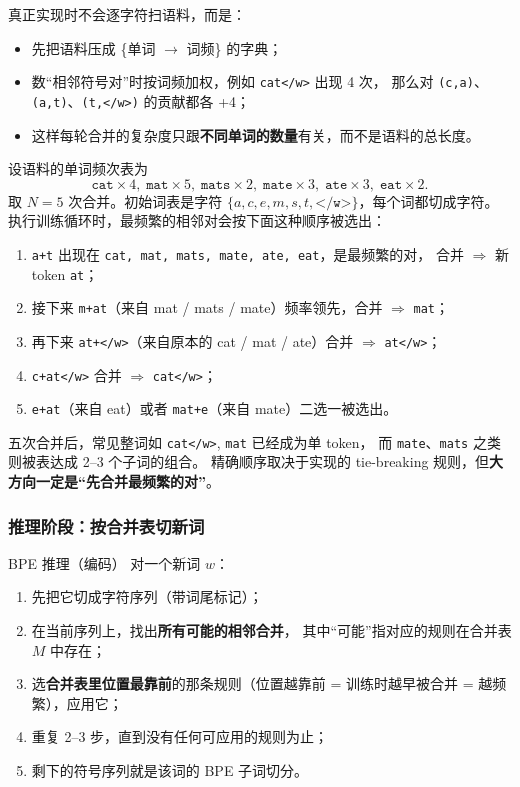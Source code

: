 \begin{engbox}[实现上的小技巧]
真正实现时不会逐字符扫语料，而是：
\begin{itemize}
    \item 先把语料压成 \{单词 $\to$ 词频\} 的字典；
    \item 数“相邻符号对”时按词频加权，例如 \texttt{cat</w>} 出现 4 次，
          那么对 \texttt{(c,a)}、\texttt{(a,t)}、\texttt{(t,</w>)} 的贡献都各 +4；
    \item 这样每轮合并的复杂度只跟\textbf{不同单词的数量}有关，而不是语料的总长度。
\end{itemize}
\end{engbox}

\begin{example}[一个迷你语料]
设语料的单词频次表为
\[
\texttt{cat}\!\times\!4,\;
\texttt{mat}\!\times\!5,\;
\texttt{mats}\!\times\!2,\;
\texttt{mate}\!\times\!3,\;
\texttt{ate}\!\times\!3,\;
\texttt{eat}\!\times\!2.
\]
取 $N=5$ 次合并。初始词表是字符 $\{a,c,e,m,s,t,\texttt{</w>}\}$，每个词都切成字符。
执行训练循环时，最频繁的相邻对会按下面这种顺序被选出：
\begin{enumerate}
    \item \texttt{a+t} 出现在 \texttt{cat, mat, mats, mate, ate, eat}，是最频繁的对，
          合并 $\Rightarrow$ 新 token \texttt{at}；
    \item 接下来 \texttt{m+at}（来自 mat / mats / mate）频率领先，合并 $\Rightarrow$ \texttt{mat}；
    \item 再下来 \texttt{at+</w>}（来自原本的 cat / mat / ate）合并 $\Rightarrow$ \texttt{at</w>}；
    \item \texttt{c+at</w>} 合并 $\Rightarrow$ \texttt{cat</w>}；
    \item \texttt{e+at}（来自 eat）或者 \texttt{mat+e}（来自 mate）二选一被选出。
\end{enumerate}
五次合并后，常见整词如 \texttt{cat</w>}, \texttt{mat} 已经成为单 token，
而 \texttt{mate}、\texttt{mats} 之类则被表达成 2--3 个子词的组合。
精确顺序取决于实现的 tie-breaking 规则，但\textbf{大方向一定是“先合并最频繁的对”}。
\end{example}

\subsubsection{推理阶段：按合并表切新词}

\begin{mathbox}{BPE 推理（编码）}
对一个新词 $w$：
\begin{enumerate}
    \item 先把它切成字符序列（带词尾标记）；
    \item 在当前序列上，找出\textbf{所有可能的相邻合并}，
          其中“可能”指对应的规则在合并表 $M$ 中存在；
    \item 选\textbf{合并表里位置最靠前}的那条规则（位置越靠前 = 训练时越早被合并 = 越频繁），应用它；
    \item 重复 2--3 步，直到没有任何可应用的规则为止；
    \item 剩下的符号序列就是该词的 BPE 子词切分。
\end{enumerate}
\end{mathbox}

